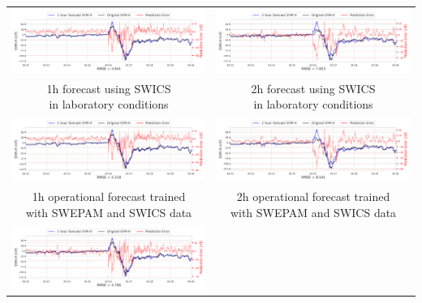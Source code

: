 \documentclass[draft,sw]{agutexSI2019}
\begin{document}
\begin{table}
\centering
\begin{tabular}{cc}
\includegraphics[width=0.49\linewidth]{paper_plots_shade/1h_swics/1h_swics_storm_29.png}
&
\includegraphics[width=0.49\linewidth]{paper_plots_shade/2h_swics/2h_swics_storm_29.png}
\\
\shortstack{1h forecast using SWICS\\ in laboratory conditions} & \shortstack{2h forecast using SWICS\\ in laboratory conditions}
\vspace*{12pt}
\\
\includegraphics[width=0.49\linewidth]{paper_plots_shade/1h_swics_rt/1h_swics_rt_storm_29.png}
&
\includegraphics[width=0.49\linewidth]{paper_plots_shade/2h_swics_rt/2h_swics_rt_storm_29.png}
\\
\shortstack{1h operational forecast trained\\ with SWEPAM and SWICS data} & \shortstack{2h operational forecast trained\\ with SWEPAM and SWICS data}
\vspace*{12pt}
\\
\includegraphics[width=0.49\linewidth]{paper_plots_shade/1h_swepam_rt/1h_swepam_rt_storm_29.png}

\end{tabular}
\end{table}
\end{document}
